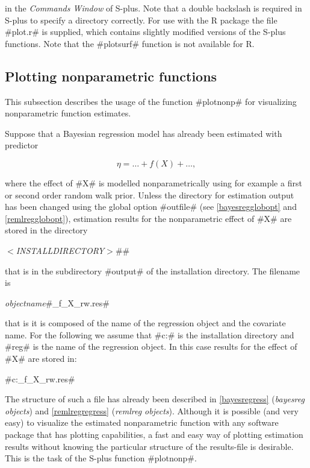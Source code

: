 in the {\em Commands Window} of S-plus. Note that a double
backslash is required in S-plus to specify a directory correctly.
For use with the R package the file #plot.r# is supplied, which
contains slightly modified versions of the S-plus functions. Note
that the #plotsurf# function is not available for R.

\subsection{Plotting nonparametric functions} \label{splusplotnonp}

This subsection describes the usage of the function #plotnonp# for
visualizing nonparametric function estimates.

Suppose that a Bayesian regression model has already been
estimated with predictor

$$
\eta = \dots + f(X) + \dots,
$$

where the effect of #X# is modelled nonparametrically using for
example a first or second order random walk prior. Unless the
directory for estimation output has been changed using the global
option #outfile# (see \autoref{bayesregglobopt} and
\autoref{remlregglobopt}), estimation results for the
nonparametric effect of #X# are stored in the directory

{\em$<$INSTALLDIRECTORY$>$}#\output#

that is in the subdirectory #output# of the installation
directory. The filename is

{\em objectname}#_f_X_rw.res#

that is it is composed of the name of the regression object and
the covariate name. For the following we assume that #c:\bayes# is
the installation directory and #reg# is the name of the regression
object. In this case results for the effect of #X# are stored in:

#c:\bayes\output\reg_f_X_rw.res#

The structure of such a file has already been described in
\autoref{bayesregress} ({\em bayesreg objects}) and
\autoref{remlregregress} ({\em remlreg objects}). Although it is
possible (and very easy) to visualize the estimated nonparametric
function with any software package that has plotting capabilities, a
fast and easy way of plotting estimation results without knowing the
particular structure of the results-file is desirable. This is the
task of the S-plus function #plotnonp#.

